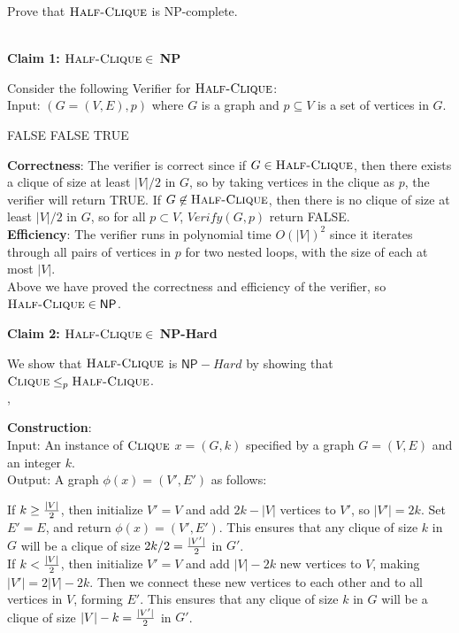 \documentclass[11pt,addpoints,answers]{exam}
\newcommand{\NP}{\textsf{NP}}
\newcommand{\ptimemap}{\leq_p}
\newcommand{\clique}{\textsc{Clique}}
\newcommand{\halfclique}{\textsc{Half-Clique}}
\begin{document}
\begin{questions}
\begin{parts}
    Prove that $\halfclique$ is \NP-complete.
    
    \begin{solution}\\
\textbf{Claim 1: \(\halfclique \in\) NP}

Consider the following Verifier for \(\halfclique\):\\
Input: \((G = (V, E), p)\) where \(G\) is a graph and $p \subseteq V$ is a set of vertices in $G$.\\
\begin{algorithmic}[1]
        \State \Return FALSE
    \EndIf
                \State \Return FALSE
            \EndIf
        \EndFor
    \EndFor
    \State \Return TRUE
    \EndFunction
\end{algorithmic}

\textbf{Correctness}:
The verifier is correct since if $G \in \halfclique$, then there exists a clique of size at least $|V|/2$ in $G$, so by taking vertices in the clique as $p$, the verifier will return TRUE. If $G \not\in \halfclique$, then there is no clique of size at least $|V|/2$ in $G$, so for all $p \subset V$, $Verify(G,p)$ return FALSE.\\
\textbf{Efficiency}:
The verifier runs in polynomial time $O(|V|)^2$ since it iterates through all pairs of vertices in \(p\) for two nested loops, with the size of each at most $|V|$.\\

Above we have proved the correctness and efficiency of the verifier, so \(\halfclique \in \NP\).

\textbf{Claim 2: $\halfclique \in$ NP-Hard}

We show that $\halfclique$ is $\NP-Hard$ by showing that $\clique \ptimemap \halfclique$.\\,

\textbf{Construction}:\\
Input: An instance of \(\clique\) \(x =(G,k)\) specified by a graph \(G = (V, E)\) and an integer \(k\).
\\Output: A graph \(\phi(x) = (V',E')\) as follows:

If \(k \geq {|V|\over 2}\), then initialize $V' = V$ and add $2k - |V|$ vertices to $V'$, so $|V'| = 2k$. Set $E' = E$, and return \(\phi(x) = (V', E')\). This ensures that any clique of size \(k\) in \(G\) will be a clique of size \(2k/2 = {|V'|\over 2}\) in \(G'\).\\ 
If \(k < {|V|\over 2}\), then initialize $V' = V$ and add \(|V| - 2k\) new vertices to \(V\), making \(|V'| = 2|V| - 2k\). Then we connect these new vertices to each other and to all vertices in \(V\), forming $E'$. This ensures that any clique of size \(k\) in \(G\) will be a clique of size \(|V|-k = {|V'|\over 2}\) in \(G'\).


\end{solution}
\end{parts}
\end{questions}
\end{document}
